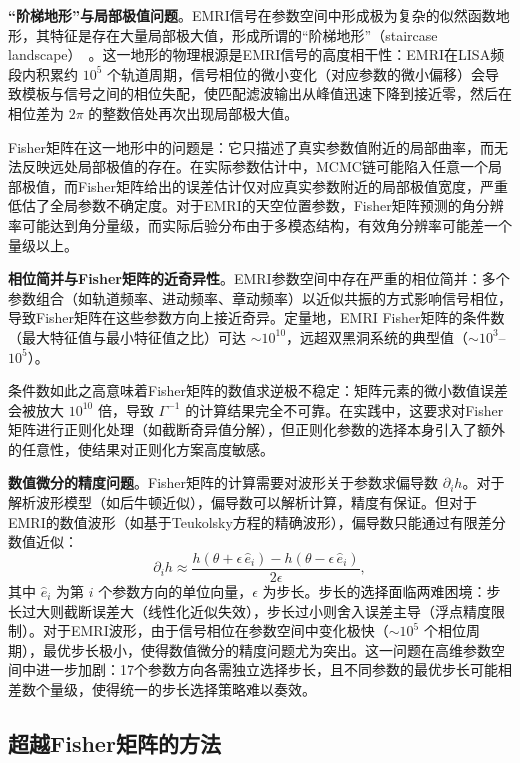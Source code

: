 \textbf{“阶梯地形”与局部极值问题}。EMRI信号在参数空间中形成极为复杂的似然函数地形，其特征是存在大量局部极大值，形成所谓的“阶梯地形”（staircase landscape）~\cite{Babak2017EMRI}。这一地形的物理根源是EMRI信号的高度相干性：EMRI在LISA频段内积累约 $10^5$ 个轨道周期，信号相位的微小变化（对应参数的微小偏移）会导致模板与信号之间的相位失配，使匹配滤波输出从峰值迅速下降到接近零，然后在相位差为 $2\pi$ 的整数倍处再次出现局部极大值。

Fisher矩阵在这一地形中的问题是：它只描述了真实参数值附近的局部曲率，而无法反映远处局部极值的存在。在实际参数估计中，MCMC链可能陷入任意一个局部极值，而Fisher矩阵给出的误差估计仅对应真实参数附近的局部极值宽度，严重低估了全局参数不确定度。对于EMRI的天空位置参数，Fisher矩阵预测的角分辨率可能达到角分量级，而实际后验分布由于多模态结构，有效角分辨率可能差一个量级以上。

\textbf{相位简并与Fisher矩阵的近奇异性}。EMRI参数空间中存在严重的相位简并：多个参数组合（如轨道频率、进动频率、章动频率）以近似共振的方式影响信号相位，导致Fisher矩阵在这些参数方向上接近奇异。定量地，EMRI Fisher矩阵的条件数（最大特征值与最小特征值之比）可达 $\sim 10^{10}$，远超双黑洞系统的典型值（$\sim 10^3$--$10^5$）。

条件数如此之高意味着Fisher矩阵的数值求逆极不稳定：矩阵元素的微小数值误差会被放大 $10^{10}$ 倍，导致 $\Gamma^{-1}$ 的计算结果完全不可靠。在实践中，这要求对Fisher矩阵进行正则化处理（如截断奇异值分解），但正则化参数的选择本身引入了额外的任意性，使结果对正则化方案高度敏感。

\textbf{数值微分的精度问题}。Fisher矩阵的计算需要对波形关于参数求偏导数 $\partial_i h$。对于解析波形模型（如后牛顿近似），偏导数可以解析计算，精度有保证。但对于EMRI的数值波形（如基于Teukolsky方程的精确波形），偏导数只能通过有限差分数值近似：
\begin{equation}
  \partial_i h \approx \frac{h(\theta + \epsilon\,\hat{e}_i) - h(\theta - \epsilon\,\hat{e}_i)}{2\epsilon},
\end{equation}
其中 $\hat{e}_i$ 为第 $i$ 个参数方向的单位向量，$\epsilon$ 为步长。步长的选择面临两难困境：步长过大则截断误差大（线性化近似失效），步长过小则舍入误差主导（浮点精度限制）。对于EMRI波形，由于信号相位在参数空间中变化极快（$\sim 10^5$ 个相位周期），最优步长极小，使得数值微分的精度问题尤为突出。这一问题在高维参数空间中进一步加剧：17个参数方向各需独立选择步长，且不同参数的最优步长可能相差数个量级，使得统一的步长选择策略难以奏效。

\subsection{超越Fisher矩阵的方法}


